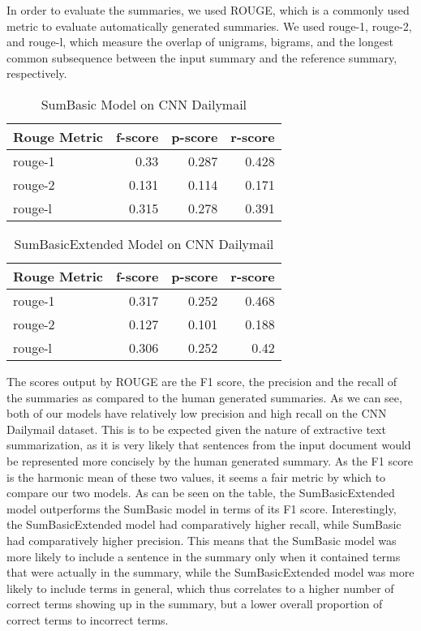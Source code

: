 \documentclass[../writeup.tex]{subfiles}
\begin{document}
In order to evaluate the summaries, we used ROUGE, which is a commonly used metric to evaluate automatically generated summaries.
We used rouge-1, rouge-2, and rouge-l, which measure the overlap of unigrams, bigrams, and the longest common subsequence between the input summary and the reference summary, respectively.
\begin{table}[h]
    \caption{SumBasic Model on CNN Dailymail}
    \begin{center}
        \begin{tabular}{lrrr}
            \hline
            Rouge Metric & f-score & p-score & r-score \\
            \hline
            rouge-1      & 0.33    & 0.287   & 0.428   \\
            rouge-2      & 0.131   & 0.114   & 0.171   \\
            rouge-l      & 0.315   & 0.278   & 0.391   \\
            \hline
        \end{tabular}
    \end{center}
    \label{sam:fig:sum_basic_cnn}
\end{table}%
\begin{table}[h]
    \caption{SumBasicExtended Model on CNN Dailymail}
    \begin{center}
        \begin{tabular}{lrrr}
            \hline
            Rouge Metric & f-score & p-score & r-score \\
            \hline
            rouge-1      & 0.317   & 0.252   & 0.468   \\
            rouge-2      & 0.127   & 0.101   & 0.188   \\
            rouge-l      & 0.306   & 0.252   & 0.42    \\
            \hline
        \end{tabular}
    \end{center}
    \label{sam:fig:extended_cnn}
\end{table}

The scores output by ROUGE are the F1 score, the precision and the recall of the summaries as compared to the human generated summaries.
As we can see, both of our models have relatively low precision and high recall on the CNN Dailymail dataset.
This is to be expected given the nature of extractive text summarization, as it is very likely that sentences from the input document would be represented more concisely by the human generated summary.
As the F1 score is the harmonic mean of these two values, it seems a fair metric by which to compare our two models.
As can be seen on the table, the SumBasicExtended model outperforms the SumBasic model in terms of its F1 score.
Interestingly, the SumBasicExtended model had comparatively higher recall, while SumBasic had comparatively higher precision.
This means that the SumBasic model was more likely to include a sentence in the summary only when it contained terms that were actually in the summary,
while the SumBasicExtended model was more likely to include terms in general, which thus correlates to a higher number of correct terms showing up in the summary, but a lower overall proportion of correct terms to incorrect terms.
\end{document}

